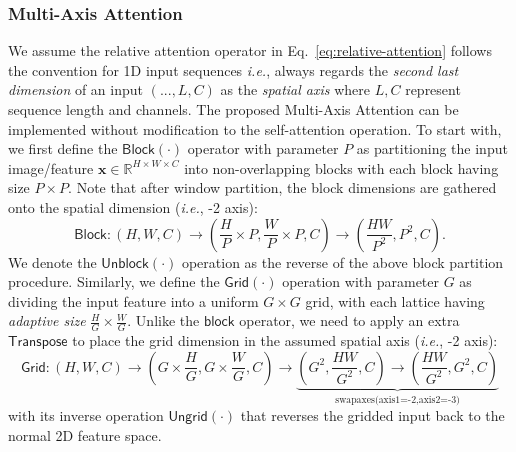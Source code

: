 \documentclass[runningheads]{llncs}
\def\ie{\emph{i.e.}, }
\begin{document}
\subsubsection{Multi-Axis Attention}
We assume the relative attention operator in Eq.~\ref{eq:relative-attention} follows the convention for 1D input sequences \ie always regards the \textit{second last dimension} of an input $(..., L, C)$ as the \textit{spatial axis} where ${L},C$ represent sequence length and channels.
The proposed Multi-Axis Attention can be implemented without modification to the self-attention operation.
To start with, we first define the $\mathsf{Block}(\cdot)$ operator with parameter $P$ as partitioning the input image/feature $\mathbf{x}\in\mathbb{R}^{H\times W\times C}$ into non-overlapping blocks with each block having size $P\times P$.
Note that after window partition, the block dimensions are gathered onto the spatial dimension (\ie -2 axis):
\begin{equation}
\label{eq:block-operator}
\mathsf{Block}: (H,W,C)\rightarrow(\frac{H}{P}\times P,\frac{W}{P}\times P,C)\rightarrow (\frac{HW}{P^2},P^2,C).
\end{equation}
We denote the $\mathsf{Unblock}(\cdot)$ operation as the reverse of the above block partition procedure.
Similarly, we define the $\mathsf{Grid}(\cdot)$ operation with parameter $G$ as dividing the input feature into a uniform $G\times G$ grid, with each lattice having \textit{adaptive size} $\frac{H}{G}\times \frac{W}{G}$. Unlike the $\mathsf{block}$ operator, we need to apply an extra $\mathsf{Transpose}$ to place the grid dimension in the assumed spatial axis (\ie -2 axis):
\begin{equation}
\label{eq:grid-operator}
\mathsf{Grid}:(H,W,C)\rightarrow(G\times \frac{H}{G},G\times\frac{W}{G},C)\rightarrow \underbrace{(G^2,\frac{HW}{G^2},C)\rightarrow
(\frac{HW}{G^2},G^2,C)}_{\text{swapaxes(axis1=-2,axis2=-3)}}
\end{equation}
with its inverse operation $\mathsf{Ungrid}(\cdot)$ that reverses the gridded input back to the normal 2D feature space.
\end{document}
